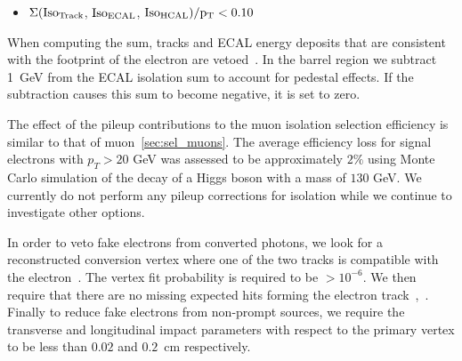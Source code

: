 \begin{itemize}
    \item $\Sigma (\rm{Iso}_{Track}$, $\rm{Iso}_{ECAL}$, $\rm{Iso}_{HCAL}) / p_T < 0.10$
\end{itemize}

When computing the sum, tracks and ECAL energy deposits that are consistent 
with the footprint of the electron are vetoed~\cite{ElIso}.
In the barrel region we subtract 1~GeV from the ECAL isolation sum to account for pedestal effects.
If the subtraction causes this sum to become negative, it is set to zero. 

The effect of the pileup contributions to the muon isolation selection efficiency 
is similar to that of muon~\ref{sec:sel_muons}. 
The average efficiency loss for signal electrons with $p_{T} > 20$ GeV 
was assessed to be approximately $2\%$ using Monte Carlo simulation of the decay
of a Higgs boson with a mass of $130$ GeV. 
We currently do not perform any pileup corrections for isolation while 
we continue to investigate other options.



In order to veto fake electrons from converted photons, 
we look for a reconstructed conversion vertex where one of the two tracks 
is compatible with the electron~\cite{ConversionNote}.
The vertex fit probability is required to be $>10^{-6}$.
We then require that there are no missing expected hits forming the electron track~\cite{ConversionNote},~\cite{NExpHits}. 
Finally to reduce fake electrons from non-prompt sources,
we require the transverse and longitudinal impact parameters with
respect to the primary vertex to be less than $0.02$ and $0.2$~cm respectively.

